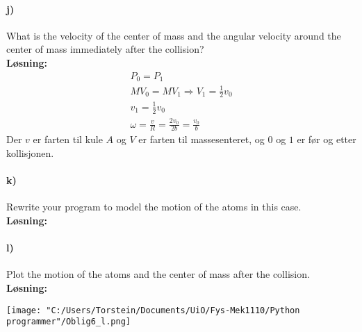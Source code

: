 \documentclass[11pt, A4paper,norsk]{article}
\begin{document}
		\paragraph{j)}
			\begin{flushleft}
What is the velocity of the center of mass and the angular velocity around the center of mass immediately after the collision? \\
\vspace{1mm}
\textbf{Løsning:} \\
\vspace{1mm}
				\begin{align}
P_0 = P_1 \nonumber \\
MV_0 = MV_1 \Rightarrow V_1 = \frac{1}{2}v_0 \nonumber \\
v_1 = \frac{1}{2}v_0 \nonumber \\
\omega = \frac{v}{R} = \frac{2v_0}{2b} = \frac{v_0}{b} \nonumber
				\end{align}
Der $v$ er farten til kule $A$ og  $V$ er farten til massesenteret, og $0$ og $1$ er før og etter kollisjonen.
			\end{flushleft}









		\paragraph{k)}
			\begin{flushleft}
Rewrite your program to model the motion of the atoms in this case. \\
\vspace{1mm}
\textbf{Løsning:} \\
\vspace{1mm}

			\end{flushleft}










		\paragraph{l)}
			\begin{flushleft}
Plot the motion of the atoms and the center of mass after the collision. \\
\vspace{1mm}
\textbf{Løsning:} \\
\vspace{1mm}

\texttt{[image: "C:/Users/Torstein/Documents/UiO/Fys-Mek1110/Python programmer"/Oblig6\_l.png]}
			\end{flushleft}
\end{document}
